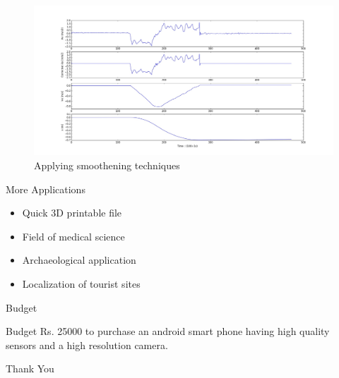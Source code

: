 \documentclass{beamer}
\begin{document}
\begin{frame}{}{}
  \begin{figure}[ht!]
    \centering
    \includegraphics[width=\linewidth]{Corrected.jpeg}
    \caption{Applying smoothening techniques}
  \end{figure}
\end{frame}

\begin{frame}{More Applications}{}
  \begin{itemize}
    \item Quick 3D printable file
    \item Field of medical science
    \item Archaeological application
    \item Localization of tourist sites
  \end{itemize}
\end{frame}

\begin{frame}{Budget}{}
\begin{block}{Budget}
Rs. 25000 to purchase an android smart phone having high quality sensors and a high resolution camera.
\end{block}
\end{frame}


\begin{frame}
\vfill
\begin{center}
\huge{Thank You}
\end{center}
\vfill
\end{frame}

\end{document}
